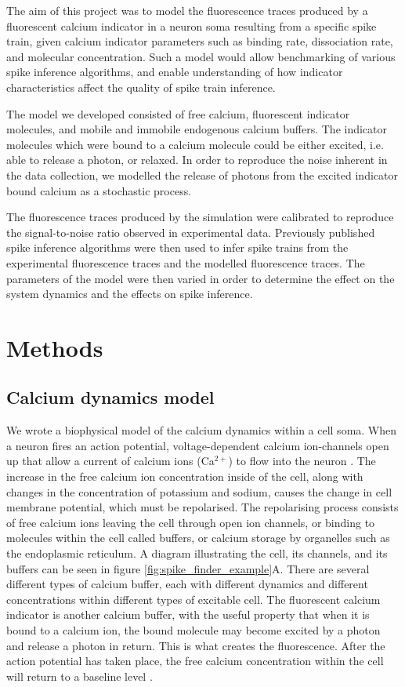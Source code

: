 The aim of this project was to model the fluorescence traces produced by a fluorescent calcium indicator in a neuron soma resulting from a specific spike train, given calcium indicator parameters such as binding rate, dissociation rate, and molecular concentration. Such a model would allow benchmarking of various spike inference algorithms, and enable understanding of how indicator characteristics affect the quality of spike train inference.

The model we developed consisted of free calcium, fluorescent indicator molecules, and mobile and immobile endogenous calcium buffers. The indicator molecules which were bound to a calcium molecule could be either excited, i.e. able to release a photon, or relaxed. In order to reproduce the noise inherent in the data collection, we modelled the release of photons from the excited indicator bound calcium as a stochastic process.

The fluorescence traces produced by the simulation were calibrated to reproduce the signal-to-noise ratio observed in experimental data. Previously published spike inference algorithms were then used to infer spike trains from the experimental fluorescence traces and the modelled fluorescence traces. The parameters of the model were then varied in order to determine the effect on the system dynamics and the effects on spike inference.

\section{Methods}
\subsection{Calcium dynamics model}
We wrote a biophysical model of the calcium dynamics within a cell soma. When a neuron fires an action potential, voltage-dependent calcium ion-channels open up that allow a current of calcium ions (Ca$^{2+}$) to flow into the neuron  \parencite{koch}. The increase in the free calcium ion concentration inside of the cell, along with changes in the concentration of potassium and sodium, causes the change in cell membrane potential, which must be repolarised. The repolarising process consists of free calcium ions leaving the cell through open ion channels, or binding to molecules within the cell called buffers, or calcium storage by organelles such as the endoplasmic reticulum. A diagram illustrating the cell, its channels, and its buffers can be seen in figure \ref{fig:spike_finder_example}A. There are several different types of calcium buffer, each with different dynamics and different concentrations within different types of excitable cell. The fluorescent calcium indicator is another calcium buffer, with the useful property that when it is bound to a calcium ion, the bound molecule may become excited by a photon and release a photon in return. This is what creates the fluorescence. After the action potential has taken place, the free calcium concentration within the cell will return to a baseline level  \parencite{maravall}.


